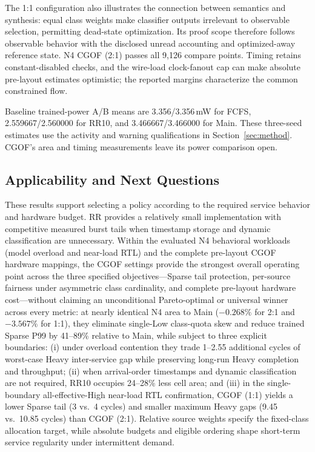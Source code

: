 The 1:1 configuration also illustrates the connection between semantics and synthesis: equal class weights make classifier outputs irrelevant to observable selection, permitting dead-state optimization. Its proof scope therefore follows observable behavior with the disclosed unread accounting and optimized-away reference state. N4 CGOF (2:1) passes all 9,126 compare points. Timing retains constant-disabled checks, and the wire-load clock-fanout cap can make absolute pre-layout estimates optimistic; the reported margins characterize the common constrained flow.

Baseline trained-power A/B means are 3.356/3.356\,mW for FCFS, 2.559667/2.560000 for RR10, and 3.466667/3.466000 for Main. These three-seed estimates use the activity and warning qualifications in Section~\ref{sec:method}. CGOF's area and timing measurements leave its power comparison open.

\balance
\subsection{Applicability and Next Questions}
These results support selecting a policy according to the required service behavior and hardware budget. RR provides a relatively small implementation with competitive measured burst tails when timestamp storage and dynamic classification are unnecessary. Within the evaluated N4 behavioral workloads (model overload and near-load RTL) and the complete pre-layout CGOF hardware mappings, the CGOF settings provide the strongest overall operating point across the three specified objectives—Sparse tail protection, per-source fairness under asymmetric class cardinality, and complete pre-layout hardware cost—without claiming an unconditional Pareto-optimal or universal winner across every metric: at nearly identical N4 area to Main ($-0.268\%$ for 2:1 and $-3.567\%$ for 1:1), they eliminate single-Low class-quota skew and reduce trained Sparse P99 by 41--89\% relative to Main, while subject to three explicit boundaries: (i) under overload contention they trade 1--2.55 additional cycles of worst-case Heavy inter-service gap while preserving long-run Heavy completion and throughput; (ii) when arrival-order timestamps and dynamic classification are not required, RR10 occupies 24--28\% less cell area; and (iii) in the single-boundary all-effective-High near-load RTL confirmation, CGOF (1:1) yields a lower Sparse tail (3 vs.\ 4 cycles) and smaller maximum Heavy gaps (9.45 vs.\ 10.85 cycles) than CGOF (2:1). Relative source weights specify the fixed-class allocation target, while absolute budgets and eligible ordering shape short-term service regularity under intermittent demand.

